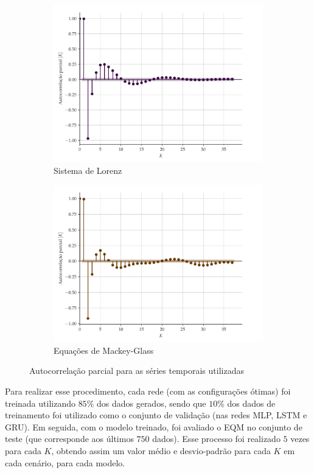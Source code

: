 \documentclass{article}
\begin{document}
\begin{figure}[H]
\begin{subfigure}[t]{0.2\textwidth}
         \includegraphics[scale=0.2]{autocorrelacao-parcial-lorenz.pdf}
         \caption{Sistema de Lorenz}
     \end{subfigure}
     \centering
     \begin{subfigure}[t]{0.2\textwidth} 
         \includegraphics[scale=0.2]{autocorrelacao-parcial-mackeyglass.pdf}
         \caption{Equações de Mackey-Glass}
     \end{subfigure}  
     \centering   
     \caption{Autocorrelação parcial para as séries temporais utilizadas}
     \label{fig:autocorrelation}
\end{figure}

Para realizar esse procedimento, cada rede (com as configurações ótimas) foi treinada utilizando $85\%$ dos dados gerados, sendo que $10\%$ dos dados de treinamento foi utilizado como o conjunto de validação (nas redes MLP, LSTM e GRU). Em seguida, com o modelo treinado, foi avaliado o EQM no conjunto de teste (que corresponde aos últimos $750$ dados). Esse processo foi realizado $5$ vezes para cada $K$, obtendo assim um valor médio e desvio-padrão para cada $K$ em cada cenário, para cada modelo.
\end{document}

